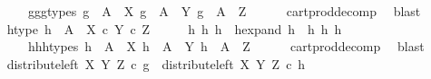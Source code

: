 \begin{isabellebody}
\ \ \ \ \ \ \ g{}{\isacharunderscore}{\kern0pt}g{}{\isacharunderscore}{\kern0pt}g{}{\isacharunderscore}{\kern0pt}types{\isacharcolon}{\kern0pt}\ {\isachardoublequoteopen}g{}\ {\isacharcolon}{\kern0pt}\ A\ {\isasymrightarrow}\ X{\isachardoublequoteclose}\ {\isachardoublequoteopen}g{}\ {\isacharcolon}{\kern0pt}\ A\ {\isasymrightarrow}\ Y{\isachardoublequoteclose}\ {\isachardoublequoteopen}g{}\ {\isacharcolon}{\kern0pt}\ A\ {\isasymrightarrow}\ Z{\isachardoublequoteclose}\isanewline
\ \ \ \ \isamarkupfalse%
\ cart{\isacharunderscore}{\kern0pt}prod{\isacharunderscore}{\kern0pt}decomp\ \isamarkupfalse%
\ blast\ \isanewline
\ \ \isamarkupfalse%
\ h{\isacharunderscore}{\kern0pt}type{\isacharcolon}{\kern0pt}\ {\isachardoublequoteopen}h\ {\isacharcolon}{\kern0pt}\ A\ {\isasymrightarrow}\ X\ {\isasymtimes}\isactrlsub c\ {\isacharparenleft}{\kern0pt}Y\ {\isasymtimes}\isactrlsub c\ Z{\isacharparenright}{\kern0pt}{\isachardoublequoteclose}\isanewline
\ \ \isamarkupfalse%
\ \isamarkupfalse%
\ h{}\ h{}\ h{}\ \ h{\isacharunderscore}{\kern0pt}expand{\isacharcolon}{\kern0pt}\ {\isachardoublequoteopen}h\ {\isacharequal}{\kern0pt}\ {\isasymlangle}h{}{\isacharcomma}{\kern0pt}\ {\isasymlangle}h{}{\isacharcomma}{\kern0pt}\ h{}{\isasymrangle}{\isasymrangle}{\isachardoublequoteclose}\isanewline
\ \ \ \ \ \ \ h{}{\isacharunderscore}{\kern0pt}h{}{\isacharunderscore}{\kern0pt}h{}{\isacharunderscore}{\kern0pt}types{\isacharcolon}{\kern0pt}\ {\isachardoublequoteopen}h{}\ {\isacharcolon}{\kern0pt}\ A\ {\isasymrightarrow}\ X{\isachardoublequoteclose}\ {\isachardoublequoteopen}h{}\ {\isacharcolon}{\kern0pt}\ A\ {\isasymrightarrow}\ Y{\isachardoublequoteclose}\ {\isachardoublequoteopen}h{}\ {\isacharcolon}{\kern0pt}\ A\ {\isasymrightarrow}\ Z{\isachardoublequoteclose}\isanewline
\ \ \ \ \isamarkupfalse%
\ cart{\isacharunderscore}{\kern0pt}prod{\isacharunderscore}{\kern0pt}decomp\ \isamarkupfalse%
\ blast\ \isanewline
\isanewline
\ \ \isamarkupfalse%
\ {\isachardoublequoteopen}distribute{\isacharunderscore}{\kern0pt}left\ X\ Y\ Z\ {\isasymcirc}\isactrlsub c\ g\ {\isacharequal}{\kern0pt}\ distribute{\isacharunderscore}{\kern0pt}left\ X\ Y\ Z\ {\isasymcirc}\isactrlsub c\ h{\isachardoublequoteclose}\isanewline

\end{isabellebody}
